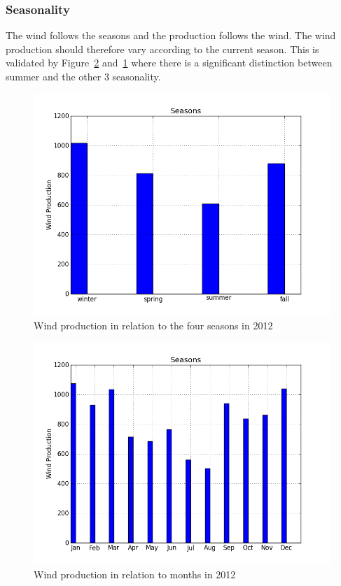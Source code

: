 \subsubsection{Seasonality}
\label{sec:windProdSeasonality}
The wind follows the seasons and the production follows the wind. The wind production should therefore vary according to the current season. This is validated by Figure~\ref{fig:windProductionMonths} and~\ref{fig:windProductionSeasons} where there is a significant distinction between summer and the other 3 seasonality.

\begin{figure}[H]
\centering
\includegraphics[width=0.99\linewidth,natwidth=898,natheight=587]{billeder/Seasons/windProdctionSeasons.png}
\caption{Wind production in relation to the four seasons in 2012}
\label{fig:windProductionSeasons}
\end{figure}

\begin{figure}[H]
\centering
\includegraphics[width=0.99\linewidth,natwidth=898,natheight=587]{billeder/Seasons/windProductionMonths.png}
\caption{Wind production in relation to months in 2012}
\label{fig:windProductionMonths}
\end{figure}

